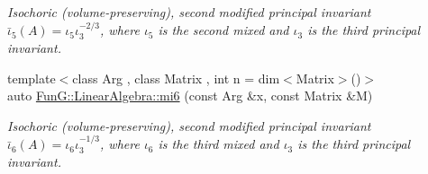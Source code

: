 \begin{DoxyCompactItemize}
\begin{DoxyCompactList}\small\item\em Isochoric (volume-\/preserving), second modified principal invariant $ \bar\iota_5(A)=\iota_5\iota_3^{-2/3} $, where $\iota_5$ is the second mixed and $\iota_3$ is the third principal invariant. \end{DoxyCompactList}\item 
{\footnotesize template$<$class Arg , class Matrix , int n = dim$<$\-Matrix$>$()$>$ }\\auto \hyperlink{group__InvariantGroup_ga3e451f9e15fa95080f81d0c0f69f93e6}{Fun\-G\-::\-Linear\-Algebra\-::mi6} (const Arg \&x, const Matrix \&M)
\begin{DoxyCompactList}\small\item\em Isochoric (volume-\/preserving), second modified principal invariant $ \bar\iota_6(A)=\iota_6\iota_3^{-1/3} $, where $\iota_6$ is the third mixed and $\iota_3$ is the third principal invariant. \end{DoxyCompactList}\end{DoxyCompactItemize}
